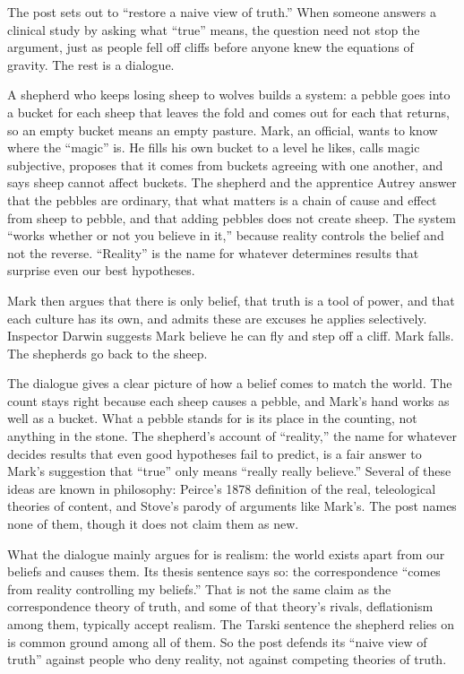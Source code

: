 \begin{afterword}
\summaryhead

The post sets out to ``restore a naive view of truth.'' When someone answers a clinical study by asking what ``true'' means, the question need not stop the argument, just as people fell off cliffs before anyone knew the equations of gravity. The rest is a dialogue.

A shepherd who keeps losing sheep to wolves builds a system: a pebble goes into a bucket for each sheep that leaves the fold and comes out for each that returns, so an empty bucket means an empty pasture. Mark, an official, wants to know where the ``magic'' is. He fills his own bucket to a level he likes, calls magic subjective, proposes that it comes from buckets agreeing with one another, and says sheep cannot affect buckets. The shepherd and the apprentice Autrey answer that the pebbles are ordinary, that what matters is a chain of cause and effect from sheep to pebble, and that adding pebbles does not create sheep. The system ``works whether or not you believe in it,'' because reality controls the belief and not the reverse. ``Reality'' is the name for whatever determines results that surprise even our best hypotheses.

Mark then argues that there is only belief, that truth is a tool of power, and that each culture has its own, and admits these are excuses he applies selectively. Inspector Darwin suggests Mark believe he can fly and step off a cliff. Mark falls. The shepherds go back to the sheep.

\responsehead

The dialogue gives a clear picture of how a belief comes to match the world. The count stays right because each sheep causes a pebble, and Mark's hand works as well as a bucket. What a pebble stands for is its place in the counting, not anything in the stone. The shepherd's account of ``reality,'' the name for whatever decides results that even good hypotheses fail to predict, is a fair answer to Mark's suggestion that ``true'' only means ``really really believe.'' Several of these ideas are known in philosophy: Peirce's 1878 definition of the real, teleological theories of content, and Stove's parody of arguments like Mark's. The post names none of them, though it does not claim them as new.

What the dialogue mainly argues for is realism: the world exists apart from our beliefs and causes them. Its thesis sentence says so: the correspondence ``comes from reality controlling my beliefs.'' That is not the same claim as the correspondence theory of truth, and some of that theory's rivals, deflationism among them, typically accept realism. The Tarski sentence the shepherd relies on is common ground among all of them. So the post defends its ``naive view of truth'' against people who deny reality, not against competing theories of truth.


\end{afterword}
